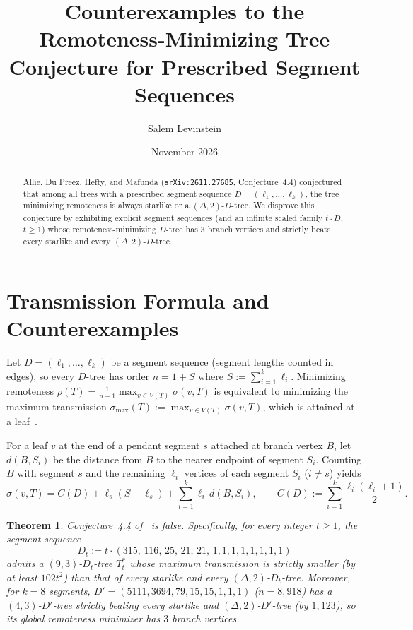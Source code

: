 \documentclass[11pt]{article}
\title{Counterexamples to the Remoteness-Minimizing Tree Conjecture for Prescribed Segment Sequences}
\author{Salem Levinstein}
\date{November 2026}
\newtheorem{theorem}{Theorem}
\begin{document}
\maketitle

\begin{abstract}
Allie, Du Preez, Hefty, and Mafunda (\texttt{arXiv:2611.27685}, Conjecture~4.4) conjectured that among all trees with a prescribed segment sequence $D = (\ell_1, \dots, \ell_k)$, the tree minimizing remoteness is always starlike or a $(\Delta, 2)$-$D$-tree. We disprove this conjecture by exhibiting explicit segment sequences (and an infinite scaled family $t \cdot D$, $t \ge 1$) whose remoteness-minimizing $D$-tree has $3$ branch vertices and strictly beats every starlike and every $(\Delta, 2)$-$D$-tree.
\end{abstract}

\section{Transmission Formula and Counterexamples}

Let $D = (\ell_1, \dots, \ell_k)$ be a segment sequence (segment lengths counted in edges), so every $D$-tree has order $n = 1 + S$ where $S := \sum_{i=1}^k \ell_i$. Minimizing remoteness $\rho(T) = \frac{1}{n-1}\max_{v \in V(T)} \sigma(v, T)$ is equivalent to minimizing the maximum transmission $\sigma_{\max}(T) := \max_{v \in V(T)} \sigma(v, T)$, which is attained at a leaf~\cite[Observation~2.7]{ADHM26}.

For a leaf $v$ at the end of a pendant segment $s$ attached at branch vertex $B$, let $d(B, S_i)$ be the distance from $B$ to the nearer endpoint of segment $S_i$. Counting $B$ with segment $s$ and the remaining $\ell_i$ vertices of each segment $S_i$ ($i \neq s$) yields
\[
\sigma(v, T) = C(D) + \ell_s(S - \ell_s) + \sum_{i=1}^k \ell_i \, d(B, S_i), \qquad C(D) := \sum_{i=1}^k \frac{\ell_i(\ell_i + 1)}{2}.
\]

\begin{theorem}
Conjecture~4.4 of~\cite{ADHM26} is false. Specifically, for every integer $t \ge 1$, the segment sequence
\[
D_t := t \cdot (315,\, 116,\, 25,\, 21,\, 21,\, 1,1,1,1,1,1,1,1)
\]
admits a $(9,3)$-$D_t$-tree $T_t^*$ whose maximum transmission is strictly smaller (by at least $102 t^2$) than that of every starlike and every $(\Delta, 2)$-$D_t$-tree. Moreover, for $k = 8$ segments, $D' = (5111, 3694, 79, 15, 15, 1, 1, 1)$ ($n = 8{,}918$) has a $(4,3)$-$D'$-tree strictly beating every starlike and $(\Delta, 2)$-$D'$-tree (by $1{,}123$), so its global remoteness minimizer has $3$ branch vertices.
\end{theorem}
\end{document}

